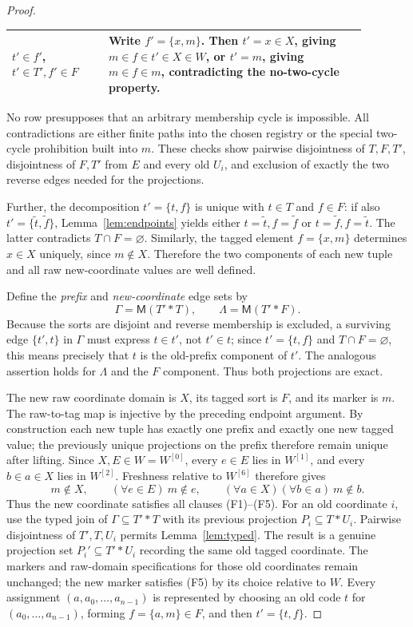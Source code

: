 \documentclass[11pt,a4paper]{article}
\numberwithin{equation}{section}
\newcommand{\up}[2]{\{#1,#2\}}
\newcommand{\UnProd}{\mathbin{\ast}}
\newcommand{\Mem}{\mathsf{M}}
\begin{document}
\begin{proof}
\begin{center}
\begin{tabular}{@{}p{0.24\linewidth}p{0.64\linewidth}@{}}
$t'\in f'$, $t'\in T',f'\in F$ & Write $f'=\up xm$.  Then $t'=x\in X$, giving $m\in f\in t'\in X\in W$, or $t'=m$, giving $m\in f\in m$, contradicting the no-two-cycle property. \\
\bottomrule
\end{tabular}
\end{center}
No row presupposes that an arbitrary membership cycle is impossible.  All contradictions are either finite paths into the chosen registry or the special two-cycle prohibition built into $m$.  These checks show pairwise disjointness of $T,F,T'$, disjointness of $F,T'$ from $E$ and every old $U_i$, and exclusion of exactly the two reverse edges needed for the projections.

Further, the decomposition $t'=\up tf$ is unique with $t\in T$ and $f\in F$: if also $t'=\up{\tilde t}{\tilde f}$, Lemma~\ref{lem:endpoints} yields either $t=\tilde t,f=\tilde f$ or $t=\tilde f,f=\tilde t$.  The latter contradicts $T\cap F=\varnothing$.  Similarly, the tagged element $f=\up xm$ determines $x\in X$ uniquely, since $m\notin X$.  Therefore the two components of each new tuple and all raw new-coordinate values are well defined.

Define the \emph{prefix} and \emph{new-coordinate} edge sets by
\begin{equation}\label{eq:projections}
\Gamma=\Mem(T'\UnProd T),\qquad
\Lambda=\Mem(T'\UnProd F).
\end{equation}
Because the sorts are disjoint and reverse membership is excluded, a surviving edge $\up{t'}t$ in $\Gamma$ must express $t\in t'$, not $t'\in t$; since $t'=\up tf$ and $T\cap F=\varnothing$, this means precisely that $t$ is the old-prefix component of $t'$.  The analogous assertion holds for $\Lambda$ and the $F$ component.  Thus both projections are exact.

The new raw coordinate domain is $X$, its tagged sort is $F$, and its marker is $m$.  The raw-to-tag map is injective by the preceding endpoint argument.  By construction each new tuple has exactly one prefix and exactly one new tagged value; the previously unique projections on the prefix therefore remain unique after lifting.  Since $X,E\in W=W^{[0]}$, every $e\in E$ lies in $W^{[1]}$, and every $b\in a\in X$ lies in $W^{[2]}$.  Freshness relative to $W^{[6]}$ therefore gives
\[
m\notin X,\qquad (\forall e\in E)\ m\notin e,
\qquad (\forall a\in X)(\forall b\in a)\ m\notin b.
\]
Thus the new coordinate satisfies all clauses (F1)--(F5).  For an old coordinate $i$, use the typed join of $\Gamma\subseteq T'\UnProd T$ with its previous projection $P_i\subseteq T\UnProd U_i$.  Pairwise disjointness of $T',T,U_i$ permits Lemma~\ref{lem:typed}.  The result is a genuine projection set $P_i'\subseteq T'\UnProd U_i$ recording the same old tagged coordinate.  The markers and raw-domain specifications for those old coordinates remain unchanged; the new marker satisfies (F5) by its choice relative to $W$.  Every assignment $(a,a_0,\ldots,a_{n-1})$ is represented by choosing an old code $t$ for $(a_0,\ldots,a_{n-1})$, forming $f=\up am\in F$, and then $t'=\up tf$.


\end{proof}
\end{document}
